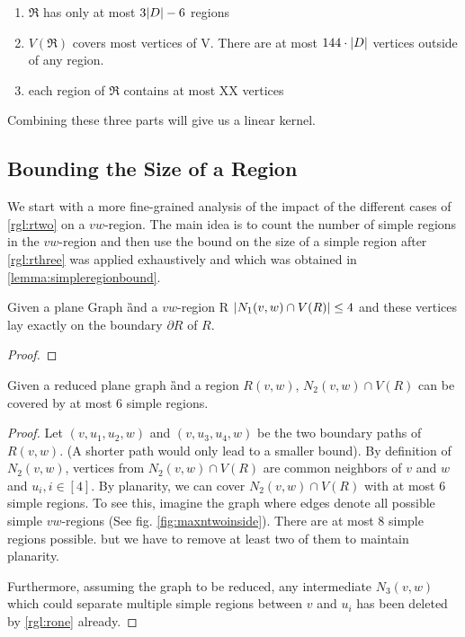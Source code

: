 \begin{enumerate}[topsep=0pt,itemsep=-1ex,partopsep=1ex,parsep=1ex]
    \item $\mathfrak{R}$ has only at most $3 \abs{D} - 6$ regions
    \item $V(\mathfrak{R})$ covers most vertices of V. There are at most $144 \cdot \abs{D}$ vertices outside of any region.
    \item each region of $\mathfrak{R}$ contains at most XX vertices
\end{enumerate}

Combining these three parts will give us a linear kernel.

\subsection{Bounding the Size of a Region}

We start with a more fine-grained analysis of the impact of the different cases of \cref{rgl:rtwo} on a $vw$-region. The main idea is to count the number of simple regions in the $vw$-region and then use the bound on the size of a simple region after \cref{rgl:rthree} was applied exhaustively and which was obtained in \cref{lemma:simpleregionbound}.   

\begin{lemma}\label{lemma:nonecover}
    Given a plane Graph \G and a $vw$-region R $\abs{N_1(v,w) \cap V(R)} \leq 4$ and these vertices lay exactly on the boundary $\partial R$ of $R$. 
\end{lemma}
\begin{proof}

\end{proof}

\begin{lemma}\cite[See Fact 5]{Garnero2018}\label{lemma:ntwocover}
    Given a reduced plane graph \G and a region $R(v,w)$, $N_2(v,w) \cap V(R)$ can be covered by at most 6 simple regions.
\end{lemma}
\begin{proof}
    Let $(v,u_1, u_2,w)$ and $(v, u_3, u_4, w)$ be the two boundary paths of $R(v,w)$. (A shorter path would only lead to a smaller bound).
    By definition of $N_2(v,w)$, vertices from $N_2(v,w) \cap V(R)$ are common neighbors of $v$ and $w$ and $u_i, i \in [4]$. By planarity, we can cover $N_2(v,w) \cap V(R)$ with at most 6 simple regions. To see this, imagine the graph where edges denote all possible simple $vw$-regions (See fig. \ref{fig:maxntwoinside}). There are at most 8 simple regions possible. but we have to remove at least two of them to maintain planarity.
    
    Furthermore, assuming the graph to be reduced, any intermediate $N_3(v,w)$ which could separate multiple simple regions between $v$ and $u_i$ has been deleted by \cref{rgl:rone} already.
\end{proof}


